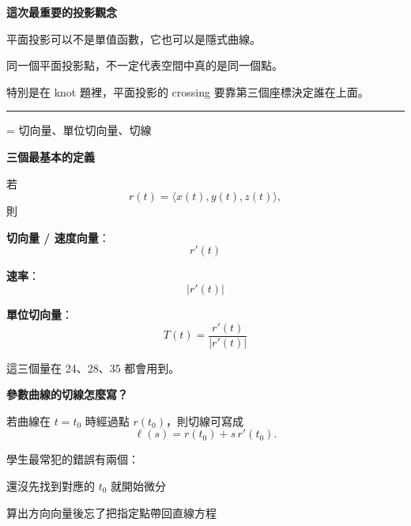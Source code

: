 \documentclass[a4paper,12pt,twocolumn]{article}
\newlength{\problemnumberwidth}
\newenvironment{teachbox}{\begin{framed}}{\end{framed}}
\newcommand{\sectiontitle}[2]{%
  \hypertarget{#1}{}%
  \par\vspace{0.8em}%
  \noindent{\Large\bfseries #2}\par
  \vspace{0.3em}%
  \hrule
  \vspace{0.8em}%
}
\newcommand{\topic}[3]{%
  \Needspace{10\baselineskip}%
  \phantomsection\label{#1}%
  \par\vspace{0.8em}%
  \noindent
  \hangindent=\problemnumberwidth
  \hangafter=1
  \makebox[\problemnumberwidth][l]{\textbf{#2.}}#3\par
}
\begin{document}
\begin{teachbox}
\textbf{這次最重要的投影觀念}

\begin{points}
\item 平面投影可以不是單值函數，它也可以是隱式曲線。
\item 同一個平面投影點，不一定代表空間中真的是同一個點。
\item 特別是在 knot 題裡，平面投影的 crossing 要靠第三個座標決定誰在上面。
\end{points}
\end{teachbox}

\sectiontitle{sec:diff}{微分工具}

\topic{topic:tangent}{6}{切向量、單位切向量、切線}

\begin{teachbox}
\textbf{三個最基本的定義}

若
\[
r(t)=\langle x(t),y(t),z(t)\rangle,
\]
則

\begin{points}
\item \textbf{切向量 / 速度向量}：
\[
r'(t)
\]
\item \textbf{速率}：
\[
|r'(t)|
\]
\item \textbf{單位切向量}：
\[
T(t)=\frac{r'(t)}{|r'(t)|}
\]
\end{points}

這三個量在 24、28、35 都會用到。
\end{teachbox}

\begin{teachbox}
\textbf{參數曲線的切線怎麼寫？}

若曲線在 \(t=t_0\) 時經過點 \(r(t_0)\)，則切線可寫成
\[
\ell(s)=r(t_0)+s\,r'(t_0).
\]

學生最常犯的錯誤有兩個：

\begin{points}
\item 還沒先找到對應的 \(t_0\) 就開始微分
\item 算出方向向量後忘了把指定點帶回直線方程
\end{points}
\end{teachbox}

\begin{center}
\end{center}
\end{document}
